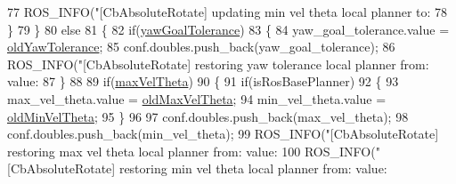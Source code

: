 \begin{DoxyCode}
{{77             ROS\_INFO(\textcolor{stringliteral}{"[CbAbsoluteRotate] updating min vel theta local planner to: %
78        \}
79     \}
80     \textcolor{keywordflow}{else}
81     \{
82         \textcolor{keywordflow}{if}(\hyperlink{classcl__move__base__z_1_1CbAbsoluteRotate_a8d8b5b9c2c821efe101bb07c96c4bdd3}{yawGoalTolerance})
83         \{
84             yaw\_goal\_tolerance.value = \hyperlink{classcl__move__base__z_1_1CbAbsoluteRotate_a2cfcd2978e7923494e2e66107e134e27}{oldYawTolerance};
85             conf.doubles.push\_back(yaw\_goal\_tolerance);
86             ROS\_INFO(\textcolor{stringliteral}{"[CbAbsoluteRotate] restoring yaw tolerance local planner from: %
       value: %
87         \}
88 
89         \textcolor{keywordflow}{if}(\hyperlink{classcl__move__base__z_1_1CbAbsoluteRotate_ac0018b01a202dd805e3d3b50ed205d23}{maxVelTheta})
90         \{
91             \textcolor{keywordflow}{if}(isRosBasePlanner)
92             \{
93                 max\_vel\_theta.value = \hyperlink{classcl__move__base__z_1_1CbAbsoluteRotate_a131095d57ad3fd423bb9eaebebf61cc9}{oldMaxVelTheta};
94                 min\_vel\_theta.value = \hyperlink{classcl__move__base__z_1_1CbAbsoluteRotate_a280721d1887e622330ee3ac44b7e84d5}{oldMinVelTheta};
95             \}
96 
97             conf.doubles.push\_back(max\_vel\_theta);
98             conf.doubles.push\_back(min\_vel\_theta);
99             ROS\_INFO(\textcolor{stringliteral}{"[CbAbsoluteRotate] restoring max vel theta local planner from: %
       value: %
100             ROS\_INFO(\textcolor{stringliteral}{"[CbAbsoluteRotate] restoring min vel theta local planner from: %
       value: %
}}}}}}
\end{DoxyCode}
